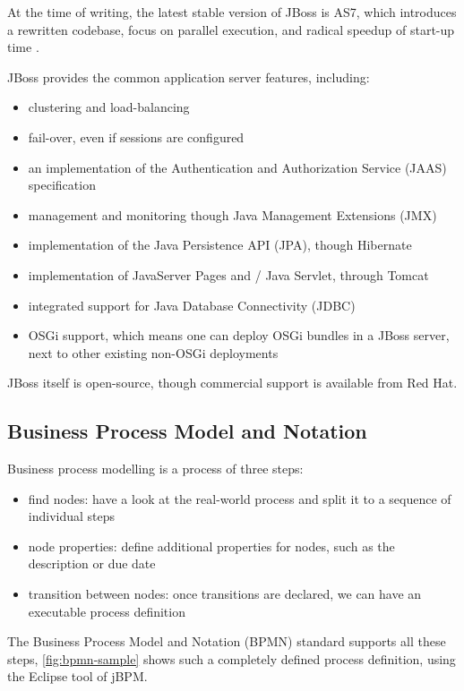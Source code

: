 At the time of writing, the latest stable version of JBoss is AS7, which
introduces a rewritten codebase, focus on parallel execution, and radical speedup
of start-up time \cite{jboss-fast}.

JBoss provides the common application server features, including:

\begin{itemize}
\item clustering and load-balancing
\item fail-over, even if sessions are configured
\item an implementation of the Authentication and Authorization Service (JAAS)
specification
\item management and monitoring though Java Management Extensions (JMX)
\item implementation of the Java Persistence API (JPA), though Hibernate
\item implementation of JavaServer Pages and / Java Servlet, through Tomcat
\item integrated support for Java Database Connectivity (JDBC)
\item OSGi support, which means one can deploy OSGi bundles in a JBoss server,
next to other existing non-OSGi deployments
\end{itemize}

JBoss itself is open-source, though commercial support is available from Red Hat.

\subsection{Business Process Model and Notation}
\label{sec:bpmn}


Business process modelling is a process of three steps:

\begin{itemize}
\item find nodes: have a look at the real-world process and split it to a sequence of individual steps
\item node properties: define additional properties for nodes, such as the description or due date
\item transition between nodes: once transitions are declared, we can have an executable process definition
\end{itemize}

The Business Process Model and Notation (BPMN) standard \cite{bpmn} supports all
these steps, \autoref{fig:bpmn-sample} shows such a completely defined
process definition, using the Eclipse tool of jBPM.


